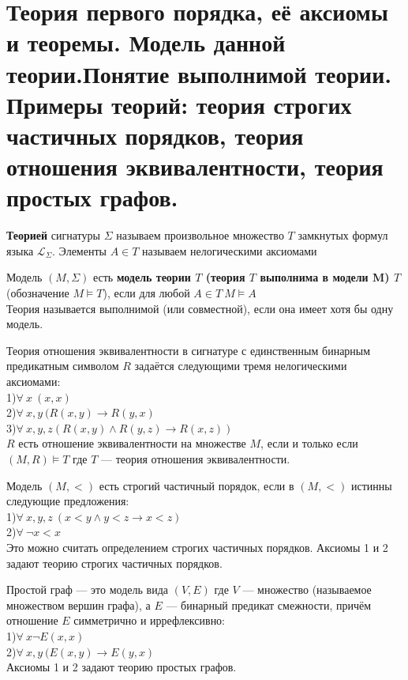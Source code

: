 \section{Теория первого порядка, её аксиомы и теоремы. Модель данной теории.Понятие выполнимой теории. Примеры теорий: теория строгих частичных порядков, теория отношения эквивалентности, теория простых графов.}
\begin{definition}
    \textbf{Теорией} сигнатуры $\Sigma$ называем произвольное множество $T$ замкнутых формул языка $\mathcal{L}_{\Sigma}$. Элементы $A \in T$ называем нелогическими аксиомами 
\end{definition}
\begin{definition}
    Модель $(M,\Sigma)$ есть \textbf{модель теории  $T$ (теория $T$ выполнима в модели M) $T$} (обозначение $M\vDash T$), если для любой $A \in T \: M\vDash A$\\ \label{formula8}
    Теория называется выполнимой (или совместной), если она имеет хотя бы одну модель.
\end{definition}
\begin{example}
Теория отношения эквивалентности в сигнатуре с единственным бинарным \\предикатным символом $R$ задаётся следующими тремя нелогическими аксиомами:\\
1)$\forall \: x\: (x,x)$\\
2)$\forall \:x,y\: (R(x,y)\rightarrow R(y,x)$\\
3)$\forall \:x,y,z (R(x,y)\wedge R(y,z)\rightarrow R(x,z))$\\
$R$ есть отношение эквивалентности на множестве $M$, если и
только если $(M,R)\vDash T$ где $T$ — теория отношения эквивалентности.
\end{example}
\begin{example}
    Модель $(M,<)$ есть строгий частичный порядок, если в $(M,<)$ истинны следующие предложения:\\
    1)$\forall \:x,y,z\: (x<y\wedge y<z \rightarrow x<z)$\\
    2)$\forall \: \neg x<x$\\
    Это можно считать определением строгих частичных порядков. Аксиомы 1 и 2 задают теорию строгих частичных порядков.
\end{example}
\begin{example}
    Простой граф — это модель вида $(V,E)$ где $V$ — множество
    (называемое множеством вершин графа), а $E$ — бинарный предикат смежности, причём отношение $E$ симметрично и иррефлексивно:\\
    1)$\forall \: x \neg E(x,x)$\\
    2)$\forall \: x,y\: (E(x,y)\rightarrow E(y,x)$\\
    Аксиомы 1 и 2 задают теорию простых графов.
\end{example}